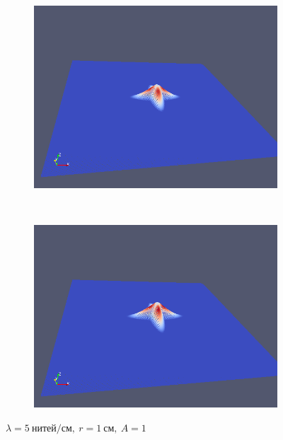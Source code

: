 \begin{figure}[H]
\begin{subfigure}[t]{0.5\textwidth}
        \includegraphics[width=\textwidth]{img/fiber/density_5_radius_1_amplitude_1/5.png}
    \end{subfigure}%
    ~
    \begin{subfigure}[t]{0.5\textwidth}
        \centering
        \includegraphics[width=\textwidth]{img/fiber/density_5_radius_1_amplitude_1/6.png}
    \end{subfigure}
    \caption{$\lambda=5~нитей/см,~r=1~см,~A=1$}
\end{figure}
